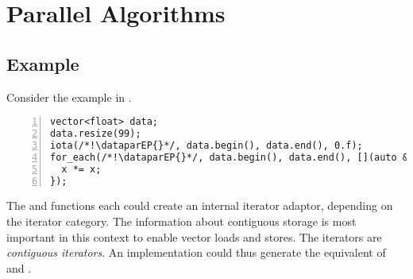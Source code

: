 \section{Parallel Algorithms}

\subsection{Example}
Consider the example in .
\begin{lstlisting}[style=Vc,numbers=left,float,label=lst:datapar foreach,caption={
  Example using \dataparEP with \code{iota} and \code{for_each}.
}]
vector<float> data;
data.resize(99);
iota(/*!\dataparEP{}*/, data.begin(), data.end(), 0.f);
for_each(/*!\dataparEP{}*/, data.begin(), data.end(), [](auto &x) {
  x *= x;
});
\end{lstlisting}
The  and  functions each could create an internal \datapar iterator adaptor, depending on the iterator category.
The information about contiguous storage is most important in this context to enable vector loads and stores.
The  iterators are \emph{contiguous iterators}.
An implementation could thus generate the equivalent of  and .



